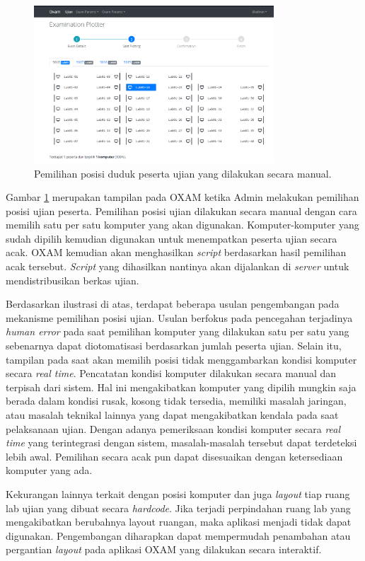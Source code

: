 \documentclass[a4paper,twoside]{article}
\begin{document}
\begin{figure}
    \centering
    \includegraphics[width=0.8\textwidth]{images/seat-plotting.PNG}
    \caption{Pemilihan posisi duduk peserta ujian yang dilakukan secara manual.}
    \label{fig:seat-plotting}
\end{figure}

Gambar \ref{fig:seat-plotting} merupakan tampilan pada OXAM ketika Admin melakukan pemilihan posisi ujian peserta. Pemilihan posisi ujian dilakukan secara manual dengan cara memilih satu per satu komputer yang akan digunakan. Komputer-komputer yang sudah dipilih kemudian digunakan untuk menempatkan peserta ujian secara acak. OXAM kemudian akan menghasilkan \textit{script} berdasarkan hasil pemilihan acak tersebut. \textit{Script} yang dihasilkan nantinya akan dijalankan di \textit{server} untuk mendistribusikan berkas ujian. 

Berdasarkan ilustrasi di atas, terdapat beberapa usulan pengembangan pada mekanisme pemilihan posisi ujian. Usulan berfokus pada pencegahan terjadinya \textit{human error} pada saat pemilihan komputer yang dilakukan satu per satu yang sebenarnya dapat diotomatisasi berdasarkan jumlah peserta ujian. Selain itu, tampilan pada saat akan memilih posisi tidak menggambarkan kondisi komputer secara \textit{real time}. Pencatatan kondisi komputer dilakukan secara manual dan terpisah dari sistem. Hal ini mengakibatkan komputer yang dipilih mungkin saja berada dalam kondisi rusak, kosong tidak tersedia, memiliki masalah jaringan, atau masalah teknikal lainnya yang dapat mengakibatkan kendala pada saat pelaksanaan ujian. Dengan adanya pemeriksaan kondisi komputer secara \textit{real time} yang terintegrasi dengan sistem, masalah-masalah tersebut dapat terdeteksi lebih awal. Pemilihan secara acak pun dapat disesuaikan dengan ketersediaan komputer yang ada.

Kekurangan lainnya terkait dengan posisi komputer dan juga \textit{layout} tiap ruang lab ujian yang dibuat secara \textit{hardcode}. Jika terjadi perpindahan ruang lab yang mengakibatkan berubahnya layout ruangan, maka aplikasi menjadi tidak dapat digunakan. Pengembangan diharapkan dapat mempermudah penambahan atau pergantian \textit{layout} pada aplikasi OXAM yang dilakukan secara interaktif.
\end{document}
